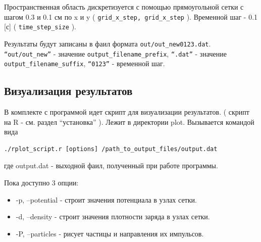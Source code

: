 Пространственная область дискретизуется с помощью прямоугольной сетки с шагом
0.3 и 0.1 см по x и y ( \texttt{grid\_x\_step, grid\_x\_step} ).
Временной шаг - 0.1 [с] ( \texttt{time\_step\_size} ).

Результаты будут записаны в фаил формата \texttt{out/out\_new0123.dat}.
\texttt{``out/out\_new''} - значение \texttt{output\_filename\_prefix},
\texttt{``.dat''} - значение \texttt{output\_filename\_suffix},
\texttt{``0123''} - временной шаг.

\subsection{ Визуализация результатов }

В комплекте с программой идет скрипт для визуализации результатов.
( скрипт на R - см. раздел ``установка'' ).
Лежит в директории plot. Вызывается командой вида
\begin{verbatim}
./rplot_script.r [options] /path_to_output_files/output.dat
\end{verbatim}
где output.dat - выходной фаил, полученный при работе программы.

Пока доступно 3 опции: 
\begin{itemize}
\item -p, --potential - строит значения потенциала в узлах сетки.
\item -d, --density - строит значения плотности заряда в узлах сетки.
\item -P, --particles - рисует частицы и направления их импульсов.
\end{itemize}

